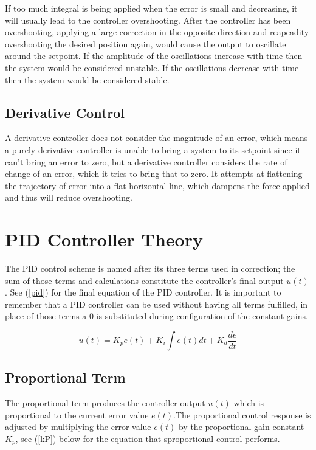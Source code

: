 \documentclass[10pt,conference]{IEEEtran}
\begin{document}
If too much integral is being applied when the error is small and decreasing, it will 
usually lead to the controller overshooting. After the controller has been 
overshooting, applying a large correction in the opposite direction and reapeadity 
overshooting the desired position again, would cause the output to oscillate around 
the setpoint. If the amplitude of the oscillations increase with time then the 
system would be considered unstable. If the oscillations decrease with time then 
the system would be considered stable.

\subsection{Derivative Control}

A derivative controller does not consider the magnitude of an error, which means 
a purely derivative controller is unable to bring a system to its setpoint since 
it can't bring an error to zero, but a derivative controller considers the rate 
of change of an error, which it tries to bring that to zero. It attempts at 
flattening the trajectory of error into a flat horizontal line, which dampens 
the force applied and thus will reduce overshooting.

\section{PID Controller Theory}

The PID control scheme is named after its three terms used in correction; the sum of those terms and
calculations constitute the controller's final output \(u(t)\). See (\ref{pid}) for the final equation of the
PID controller. It is important to remember that a PID controller can be used without having all terms
fulfilled, in place of those terms a 0 is substituted during configuration of the constant gains.

\begin{equation}
    \displaystyle {u(t)=K_pe(t)+K_i\int e(t)dt + K_d\frac{de}{dt}}\label{pid}
\end{equation}

\subsection{Proportional Term}

The proportional term produces the controller output \(u(t)\) which is proportional to the current
error value \(e(t)\).The proportional control response is adjusted by multiplying the error
value \(e(t)\) by the proportional gain constant \(K_p\), see (\ref{kP}) below for the equation that
sproportional control performs.
\end{document}
